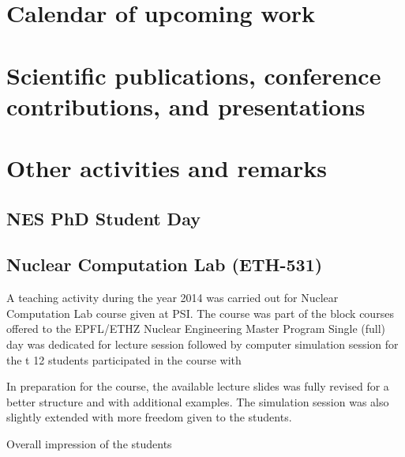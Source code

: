 \documentclass[11pt,titlepage]{article}
\begin{document}
\section{Calendar of upcoming work}


\pagebreak

\section{Scientific publications, conference contributions, and presentations}

\nocite{Wicaksono2014a}
\nocite{Wicaksono2014b}
\nocite{Wicaksono2014c}
\nocite{Wicaksono2014d}
\nocite{Wicaksono2014e}
\printbibliography[heading=none]

\section{Other activities and remarks}

\subsection{NES PhD Student Day}

\subsection{Nuclear Computation Lab (ETH-531)}

A teaching activity during the year 2014 was carried out for Nuclear Computation Lab 
course given at PSI.
The course was part of the block courses offered to the EPFL/ETHZ Nuclear 
Engineering Master Program
Single (full) day was dedicated for lecture session followed by computer 
simulation session for the t
12 students participated in the course with 

In preparation for the course, the available lecture slides was fully revised 
for a better structure and with additional examples.
The simulation session was also slightly extended with more freedom given to 
the students.

Overall impression of the students


 
\end{document}

